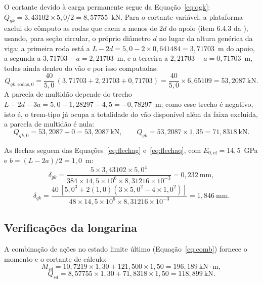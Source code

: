 \begin{appendices}
O cortante devido à carga permanente segue da Equação~\eqref{eq:qgk}: $Q_{gk} = 3{,}43102 \times 5{,}0/2 = 8{,}57755$~kN.
Para o cortante variável, a plataforma exclui do cômputo as rodas que caem a menos de $2d$ do apoio (item 6.4.3 da \textcite{NBR7190-1:2022}), usando, para seção circular, o próprio diâmetro $d$ no lugar da altura genérica da viga: a primeira roda está a $L - 2d = 5{,}0 - 2\times0{,}641484 = 3{,}71703$~m do apoio, a segunda a $3{,}71703 - a = 2{,}21703$~m, e a terceira a $2{,}21703 - a = 0{,}71703$~m, todas ainda dentro do vão e por isso computadas:
\begin{equation*}
Q_{qk,\mathrm{rodas},0} = \frac{40}{5{,}0}\,(3{,}71703 + 2{,}21703 + 0{,}71703) = \frac{40}{5{,}0}\times6{,}65109 = 53{,}2087~\text{kN}.
\end{equation*}
A parcela de multidão depende do trecho $L - 2d - 3a = 5{,}0 - 1{,}28297 - 4{,}5 = -0{,}78297$~m; como esse trecho é negativo, isto é, o trem-tipo já ocupa a totalidade do vão disponível além da faixa excluída, a parcela de multidão é nula:
\begin{equation*}
Q_{qk,0} = 53{,}2087 + 0 = 53{,}2087~\text{kN}, \qquad Q_{qk} = 53{,}2087 \times 1{,}35 = 71{,}8318~\text{kN}.
\end{equation*}

As flechas seguem das Equações~\eqref{eq:flechag} e~\eqref{eq:flechaq}, com $E_{0,\mathrm{ef}} = 14{,}5$~GPa e $b = (L - 2a)/2 = 1{,}0$~m:
\begin{equation*}
\delta_{gk} = \frac{5 \times 3{,}43102 \times 5{,}0^4}{384 \times 14{,}5\times10^6 \times 8{,}31216\times10^{-3}} = 0{,}232~\text{mm},
\end{equation*}
\begin{equation*}
\delta_{qk} = \frac{40\,[5{,}0^3 + 2(1{,}0)(3\times5{,}0^2-4\times1{,}0^2)]}{48 \times 14{,}5\times10^6 \times 8{,}31216\times10^{-3}} = 1{,}846~\text{mm}.
\end{equation*}

\subsection{Verificações da longarina}

A combinação de ações no estado limite último (Equação~\eqref{eq:comb}) fornece o momento e o cortante de cálculo:
\begin{equation*}
M_{sd} = 10{,}7219 \times 1{,}30 + 121{,}500 \times 1{,}50 = 196{,}189~\text{kN}\cdot\text{m},
\end{equation*}
\begin{equation*}
Q_{sd} = 8{,}57755 \times 1{,}30 + 71{,}8318 \times 1{,}50 = 118{,}899~\text{kN}.
\end{equation*}


\end{appendices}
